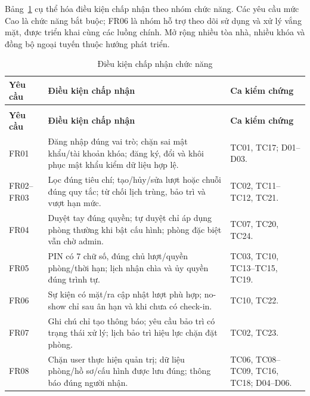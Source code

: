 Bảng~\ref{tab:acceptance} cụ thể hóa điều kiện chấp nhận theo nhóm chức năng. Các yêu cầu mức Cao là chức năng bắt buộc; FR06 là nhóm hỗ trợ theo dõi sử dụng và xử lý vắng mặt, được triển khai cùng các luồng chính. Mở rộng nhiều tòa nhà, nhiều khóa và đồng bộ ngoại tuyến thuộc hướng phát triển.
{\tabletext\renewcommand{\arraystretch}{1.04}\begin{longtable}{>{\raggedright\arraybackslash}p{}>{\raggedright\arraybackslash}p{}>{\raggedright\arraybackslash}p{}}
\caption{Điều kiện chấp nhận chức năng}\label{tab:acceptance}\\
\toprule \textbf{Yêu cầu} & \textbf{Điều kiện chấp nhận} & \textbf{Ca kiểm chứng}\\\midrule
\endfirsthead
\multicolumn{3}{l}{\small Điều kiện chấp nhận chức năng (tiếp)}\\
\toprule \textbf{Yêu cầu} & \textbf{Điều kiện chấp nhận} & \textbf{Ca kiểm chứng}\\\midrule
\endhead\bottomrule\endlastfoot
FR01 & Đăng nhập đúng vai trò; chặn sai mật khẩu/tài khoản khóa; đăng ký, đổi và khôi phục mật khẩu kiểm dữ liệu hợp lệ. & TC01, TC17; D01--D03.\\
FR02--FR03 & Lọc đúng tiêu chí; tạo/hủy/sửa lượt hoặc chuỗi đúng quy tắc; từ chối lịch trùng, bảo trì và vượt hạn mức. & TC02, TC11--TC12, TC21.\\
FR04 & Duyệt tay đúng quyền; tự duyệt chỉ áp dụng phòng thường khi bật cấu hình; phòng đặc biệt vẫn chờ admin. & TC07, TC20, TC24.\\
FR05 & PIN có 7 chữ số, đúng chủ lượt/quyền phòng/thời hạn; lịch nhận chìa và ủy quyền đúng trình tự. & TC03, TC10, TC13--TC15, TC19.\\
FR06 & Sự kiện có mặt/ra cập nhật lượt phù hợp; no-show chỉ sau ân hạn và khi chưa có check-in. & TC10, TC22.\\
FR07 & Ghi chú chỉ tạo thông báo; yêu cầu bảo trì có trạng thái xử lý; lịch bảo trì hiệu lực chặn đặt phòng. & TC02, TC23.\\
FR08 & Chặn user thực hiện quản trị; dữ liệu phòng/hồ sơ/cấu hình được lưu đúng; thông báo đúng người nhận. & TC06, TC08--TC09, TC16, TC18; D04--D06.\\
\end{longtable}}
